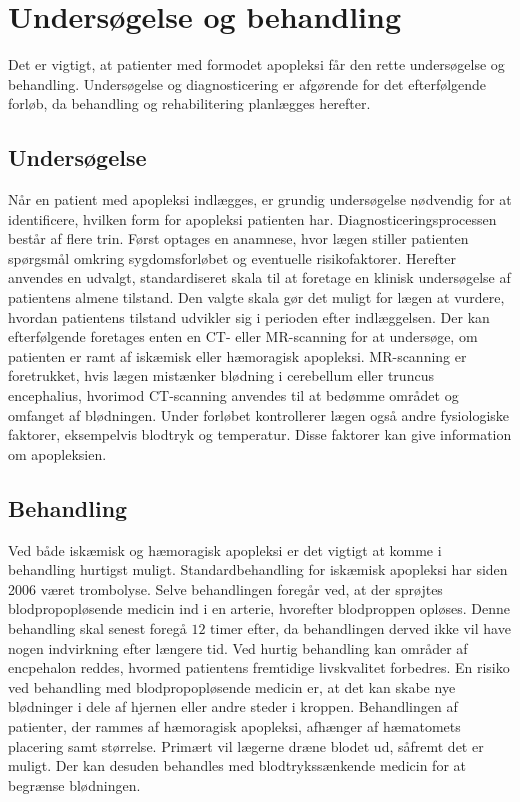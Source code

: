 \section{Undersøgelse og behandling}
Det er vigtigt, at patienter med formodet apopleksi får den rette undersøgelse og behandling. Undersøgelse og diagnosticering er afgørende for det efterfølgende forløb, da behandling og rehabilitering planlægges herefter. \cite{Sundhedsstyrelsen2009}

\subsection{Undersøgelse}
Når en patient med apopleksi indlægges, er grundig undersøgelse nødvendig for at identificere, hvilken form for apopleksi patienten har. 
Diagnosticeringsprocessen består af flere trin. Først optages en anamnese, hvor lægen stiller patienten spørgsmål omkring sygdomsforløbet og eventuelle risikofaktorer. Herefter anvendes en udvalgt, standardiseret skala til at foretage en klinisk undersøgelse af patientens almene tilstand. Den valgte skala gør det muligt for lægen at vurdere, hvordan patientens tilstand udvikler sig i perioden efter indlæggelsen.
Der kan efterfølgende foretages enten en CT- eller MR-scanning for at undersøge, om patienten er ramt af iskæmisk eller hæmoragisk apopleksi. MR-scanning er foretrukket, hvis lægen mistænker blødning i cerebellum eller truncus encephalius, hvorimod CT-scanning anvendes til at bedømme området og omfanget af blødningen. Under forløbet kontrollerer lægen også andre fysiologiske faktorer, eksempelvis blodtryk og temperatur. Disse faktorer kan give information om apopleksien. \cite{Sundhedsstyrelsen2009,Schulze2011} 

\subsection{Behandling}
Ved både iskæmisk og hæmoragisk apopleksi er det vigtigt at komme i behandling hurtigst muligt. \cite{Soenderborg2013}  
Standardbehandling for iskæmisk apopleksi har siden 2006 været trombolyse. Selve behandlingen foregår ved, at der sprøjtes blodpropopløsende medicin ind i en arterie, hvorefter blodproppen opløses. Denne behandling skal senest foregå $12$ timer efter, da behandlingen derved ikke vil have nogen indvirkning efter længere tid. Ved hurtig behandling kan områder af encpehalon reddes, hvormed patientens fremtidige livskvalitet forbedres. En risiko ved behandling med blodpropopløsende medicin er, at det kan skabe nye blødninger i dele af hjernen eller andre steder i kroppen. \cite{Hjernesagen2015b} Behandlingen af patienter, der rammes af hæmoragisk apopleksi, afhænger af hæmatomets placering samt størrelse. Primært vil lægerne dræne blodet ud, såfremt det er muligt. Der kan desuden behandles med blodtrykssænkende medicin for at begrænse blødningen. \cite{Caplan2006} 

